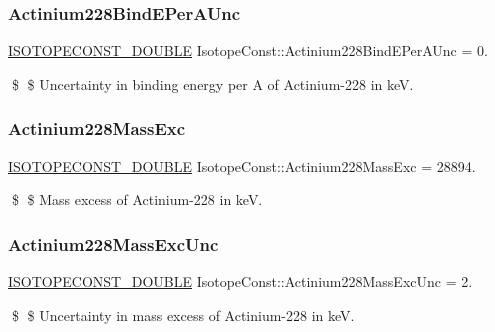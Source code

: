 \subsubsection{\texorpdfstring{Actinium228\+Bind\+E\+Per\+A\+Unc}{Actinium228BindEPerAUnc}}
{\footnotesize\ttfamily \mbox{\hyperlink{group___isotope_const-_macros_ga8f45a7272ce02c0b4c65c44636ed719a}{I\+S\+O\+T\+O\+P\+E\+C\+O\+N\+S\+T\+\_\+\+D\+O\+U\+B\+LE}} Isotope\+Const\+::\+Actinium228\+Bind\+E\+Per\+A\+Unc = 0.}

\$ \$ Uncertainty in binding energy per A of Actinium-\/228 in keV. \mbox{\label{group___isotope_const-_actinium-_ac228_ga855a24fa9382f48dbd93096f1abfa53f}} 
\subsubsection{\texorpdfstring{Actinium228\+Mass\+Exc}{Actinium228MassExc}}
{\footnotesize\ttfamily \mbox{\hyperlink{group___isotope_const-_macros_ga8f45a7272ce02c0b4c65c44636ed719a}{I\+S\+O\+T\+O\+P\+E\+C\+O\+N\+S\+T\+\_\+\+D\+O\+U\+B\+LE}} Isotope\+Const\+::\+Actinium228\+Mass\+Exc = 28894.}

\$ \$ Mass excess of Actinium-\/228 in keV. \mbox{\label{group___isotope_const-_actinium-_ac228_ga30dd87d7ff6e8ab5b5d538595e3476ec}} 
\subsubsection{\texorpdfstring{Actinium228\+Mass\+Exc\+Unc}{Actinium228MassExcUnc}}
{\footnotesize\ttfamily \mbox{\hyperlink{group___isotope_const-_macros_ga8f45a7272ce02c0b4c65c44636ed719a}{I\+S\+O\+T\+O\+P\+E\+C\+O\+N\+S\+T\+\_\+\+D\+O\+U\+B\+LE}} Isotope\+Const\+::\+Actinium228\+Mass\+Exc\+Unc = 2.}

\$ \$ Uncertainty in mass excess of Actinium-\/228 in keV. \mbox{\label{group___isotope_const-_actinium-_ac228_gaaf30f63a1b50d49738374f0e240a46fa}} 

